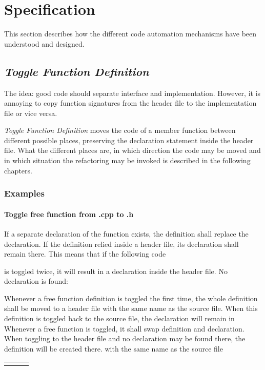 \chapter{Specification}
\thispagestyle{fancy}

This section describes how the different code automation mechanisms have been
understood and designed.

\section{\textit{Toggle Function Definition}}

The idea: good code should separate interface and implementation. However, it is 
annoying to copy function signatures from the header file to the implementation 
file or vice versa. 

\textit{Toggle Function Definition} moves the code of a member function between 
different possible places, preserving the declaration statement inside the 
header file. What the different places are, in which direction the code may be 
moved and in which situation the refactoring may be invoked is described in the 
following chapters. 

\subsection{Examples}

\subsubsection{Toggle free function from .cpp to .h}
If a separate declaration of the function exists, the definition shall replace 
the declaration. If the definition relied inside a header file, its declaration 
shall remain there. This means that if the following code 



is toggled twice, it will result in a declaration inside the header file.
No declaration is found: 

Whenever a free function definition is toggled the first time, the whole 
definition shall be moved to a header file with the same name as the source 
file. When this definition is toggled back to the source file, the declaration will remain in
Whenever a free function is toggled, it shall swap definition and declaration. 
When toggling to the header file and no declaration may be found there, the 
definition will be created there.
with the same name as the source file
\begin{tabular}{p{5cm}p{.4cm}p{5cm}}

& & 

\end{tabular}

